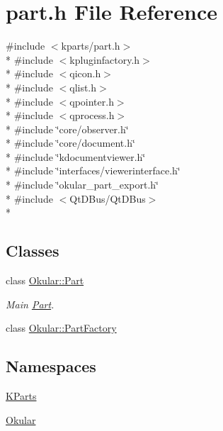 \hypertarget{home_2ganesh_2okular-src_2part_8h}{\section{part.\+h File Reference}
\label{home_2ganesh_2okular-src_2part_8h}
}
{\ttfamily \#include $<$kparts/part.\+h$>$}\\*
{\ttfamily \#include $<$kpluginfactory.\+h$>$}\\*
{\ttfamily \#include $<$qicon.\+h$>$}\\*
{\ttfamily \#include $<$qlist.\+h$>$}\\*
{\ttfamily \#include $<$qpointer.\+h$>$}\\*
{\ttfamily \#include $<$qprocess.\+h$>$}\\*
{\ttfamily \#include \char`\"{}core/observer.\+h\char`\"{}}\\*
{\ttfamily \#include \char`\"{}core/document.\+h\char`\"{}}\\*
{\ttfamily \#include \char`\"{}kdocumentviewer.\+h\char`\"{}}\\*
{\ttfamily \#include \char`\"{}interfaces/viewerinterface.\+h\char`\"{}}\\*
{\ttfamily \#include \char`\"{}okular\+\_\+part\+\_\+export.\+h\char`\"{}}\\*
{\ttfamily \#include $<$Qt\+D\+Bus/\+Qt\+D\+Bus$>$}\\*
\subsection*{Classes}
\begin{DoxyCompactItemize}
\item 
class \hyperlink{classOkular_1_1Part}{Okular\+::\+Part}
\begin{DoxyCompactList}\small\item\em Main \hyperlink{classOkular_1_1Part}{Part}. \end{DoxyCompactList}\item 
class \hyperlink{classOkular_1_1PartFactory}{Okular\+::\+Part\+Factory}
\end{DoxyCompactItemize}
\subsection*{Namespaces}
\begin{DoxyCompactItemize}
\item 
 \hyperlink{namespaceKParts}{K\+Parts}
\item 
 \hyperlink{namespaceOkular}{Okular}
\end{DoxyCompactItemize}
